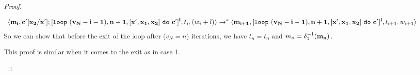 \documentclass[a4paper,11pt]{article}
\begin{document}
\begin{proof}
\begin{itemize}
{\begin{enumerate}
\[{  }{
  \langle \mathbf{{ {m_i}, c'[ \bar{x_2}/\bar{x}'  ];  [\mathtt{loop} ~ (v_N-i-1), n+1, [\bar{\mathbf{{x}}}', \bar{\mathbf{{x_1}}}, \bar{\mathbf{{x_2}}}] ~  \mathtt{do} ~ c' ]^{l} }},  t_i, (w_i + l)   \rangle  \to^{*} \\ \langle  \mathbf{{{m_{i+1}}, [\mathtt{loop} ~ (v_N-i-1), n+1, [\bar{\mathbf{{x}}}', \bar{\mathbf{{x_1}}}, \bar{\mathbf{{x_2}}}] ~  \mathtt{do} ~ c' ]^{l}}}, t_{i+1}, w_{i+1}   \rangle 
  }
\]
So we can show that before the exit of the loop after ($v_N= n $) iterations, we have $t_{n} = t_{n}$ and $m_{n} = \delta_1^{-1}(\mathbf{{m_{n}}})$.
 \end{enumerate}
%
This proof is similar when it comes to the exit as in case 1. 
}
%



\end{itemize}
\end{proof}
\end{document}

